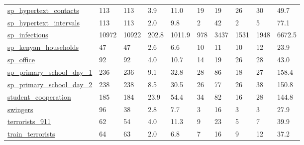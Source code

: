 \begin{longtable}{llllllllll}
 \href{http://www.sociopatterns.org/datasets/hypertext-2009-dynamic-contact-network/}{sp\_hypertext\_contacts}                & 113        & 113   & 3.9    & 11.0   & 19    & 19     & 26     & 30     & 49.7    \\
 \href{http://www.sociopatterns.org/datasets/hypertext-2009-dynamic-contact-network/}{sp\_hypertext\_intervals}               & 113        & 113   & 2.0    & 9.8    & 2     & 42     & 2      & 5      & 77.1    \\
 \href{http://www.sociopatterns.org/datasets/infectious-sociopatterns-dynamic-contact-networks/}{sp\_infectious}             & 10972      & 10922 & 202.8  & 1011.9 & 978   & 3437   & 1531   & 1948   & 6672.5  \\
 \href{http://www.sociopatterns.org/datasets/kenyan-households-contact-network/}{sp\_kenyan\_households}                      & 47         & 47    & 2.6    & 6.6    & 10    & 11     & 10     & 12     & 23.9    \\
 \href{http://www.sociopatterns.org/datasets/contacts-in-a-workplace/}{sp\_office}                                           & 92         & 92    & 4.0    & 10.7   & 14    & 19     & 26     & 28     & 43.0    \\
 \href{http://www.sociopatterns.org/datasets/primary-school-cumulative-networks/}{sp\_primary\_school\_day\_1}                  & 236        & 236   & 9.1    & 32.8   & 28    & 86     & 18     & 27     & 158.4   \\
 \href{http://www.sociopatterns.org/datasets/primary-school-cumulative-networks/}{sp\_primary\_school\_day\_2}                  & 238        & 238   & 8.5    & 30.5   & 26    & 77     & 26     & 38     & 150.8   \\
 \href{https://homes.cs.washington.edu/~fire/}{student\_cooperation}                                                         & 185        & 184   & 23.9   & 54.4   & 34    & 82     & 16     & 28     & 144.8   \\
 \href{https://sites.google.com/site/ucinetsoftware/datasets/covert-networks/swingers}{swingers}                            & 96         & 38    & 2.8    & 7.7    & 3     & 16     & 3      & 3      & 27.9    \\
 \href{http://tuvalu.santafe.edu/~aaronc/datacode.htm}{terrorists\_911}                                                      & 62         & 54    & 4.0    & 11.3   & 9     & 23     & 5      & 7      & 39.9    \\
 \href{http://konect.cc/networks/moreno_train}{train\_terrorists}                                                            & 64         & 63    & 2.0    & 6.8    & 7     & 16     & 9      & 12     & 37.2    \\

\end{longtable}
